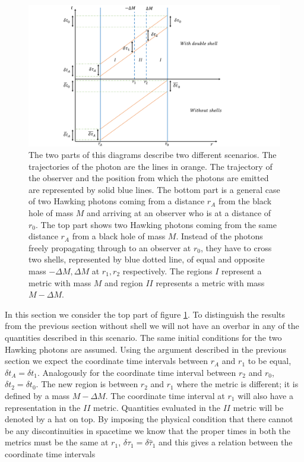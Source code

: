 \documentclass[aps,showpacs,twocolumn,floats,prd,superscriptaddress,nofootinbib]{revtex4-1}
\begin{document}
\begin{figure}[h!]
\begin{center}
\includegraphics[scale = 0.6]{Propertime.pdf}
\caption{The two parts of this diagrams describe two different scenarios. The trajectories of the photon are the lines in orange. The trajectory of the observer and the position from which the photons are emitted are represented by solid blue lines. The bottom part is a general case of two Hawking photons coming from a distance $r_A$ from the black hole of mass $M$ and arriving at an observer who is at a distance of $r_0$. The top part shows two Hawking photons coming from the same distance $r_A$ from a black hole of mass $M$. Instead of the photons freely propagating through to an observer at $r_0$, they have to cross two shells, represented by blue dotted line, of equal and opposite mass $-\Delta M, \Delta M$ at $r_{1}, r_{2}$ respectively. The regions $I$ represent a metric with mass $M$ and region $II$ represents a metric with mass $M-\Delta M$.}
\label{fig:1}
\end{center}
\end{figure}


In this section we consider the top part of figure \ref{fig:1}. To distinguish the results from the previous section without shell we will not have an overbar in any of the quantities described in this scenario. The same initial conditions for the two Hawking photons are assumed. Using the argument described in the previous section we expect the coordinate time intervals between $r_A$ and $r_1$ to be equal, $\delta t_A = \delta t_1$. Analogously for the coordinate time interval between $r_2$ and $r_0$, $\delta t_2 = \delta t_0$. The new region is between $r_2$ and $r_1$ where the metric is different; it is defined by a mass $M - \Delta M$. The coordinate time interval at $r_1$ will also have a representation in the $II$ metric. Quantities evaluated in the $II$ metric will be denoted by a hat on top. By imposing the physical condition that there cannot be any discontinuities in spacetime we know that the proper times in both the metrics must be the same at $r_1$, $\delta \tau_1 = \delta \hat{\tau}_1$ and this gives a relation between the coordinate time intervals
\end{document}
